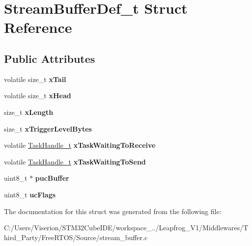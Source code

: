 \hypertarget{struct_stream_buffer_def__t}{}\section{Stream\+Buffer\+Def\+\_\+t Struct Reference}
\label{struct_stream_buffer_def__t}
\subsection*{Public Attributes}
\begin{DoxyCompactItemize}
\item 
\mbox{\label{struct_stream_buffer_def__t_a937e441ed6c946a099d52b5955d7302c}} 
volatile size\+\_\+t {\bfseries x\+Tail}
\item 
\mbox{\label{struct_stream_buffer_def__t_a75aafb9fdee8f0666837302bd9b12341}} 
volatile size\+\_\+t {\bfseries x\+Head}
\item 
\mbox{\label{struct_stream_buffer_def__t_a6eedf41c877edd42b3b460780d1b6555}} 
size\+\_\+t {\bfseries x\+Length}
\item 
\mbox{\label{struct_stream_buffer_def__t_a4a7ee9b374cc0b358d049811def8d595}} 
size\+\_\+t {\bfseries x\+Trigger\+Level\+Bytes}
\item 
\mbox{\label{struct_stream_buffer_def__t_a8377ae8625121efa22d66e678add4057}} 
volatile \mbox{\hyperlink{structtsk_task_control_block}{Task\+Handle\+\_\+t}} {\bfseries x\+Task\+Waiting\+To\+Receive}
\item 
\mbox{\label{struct_stream_buffer_def__t_a85b1cf05c0222f8d67a64f7d01722e52}} 
volatile \mbox{\hyperlink{structtsk_task_control_block}{Task\+Handle\+\_\+t}} {\bfseries x\+Task\+Waiting\+To\+Send}
\item 
\mbox{\label{struct_stream_buffer_def__t_a4e05054a8a3d61a5cec0c18a70bbdb67}} 
uint8\+\_\+t $\ast$ {\bfseries puc\+Buffer}
\item 
\mbox{\label{struct_stream_buffer_def__t_a1afd02d997a1cb3149e3cf203c681d58}} 
uint8\+\_\+t {\bfseries uc\+Flags}
\end{DoxyCompactItemize}


The documentation for this struct was generated from the following file\+:\begin{DoxyCompactItemize}
\item 
C\+:/\+Users/\+Viserion/\+S\+T\+M32\+Cube\+I\+D\+E/workspace\+\_../\+Leapfrog\+\_\+\+V1/\+Middlewares/\+Third\+\_\+\+Party/\+Free\+R\+T\+O\+S/\+Source/stream\+\_\+buffer.\+c\end{DoxyCompactItemize}
